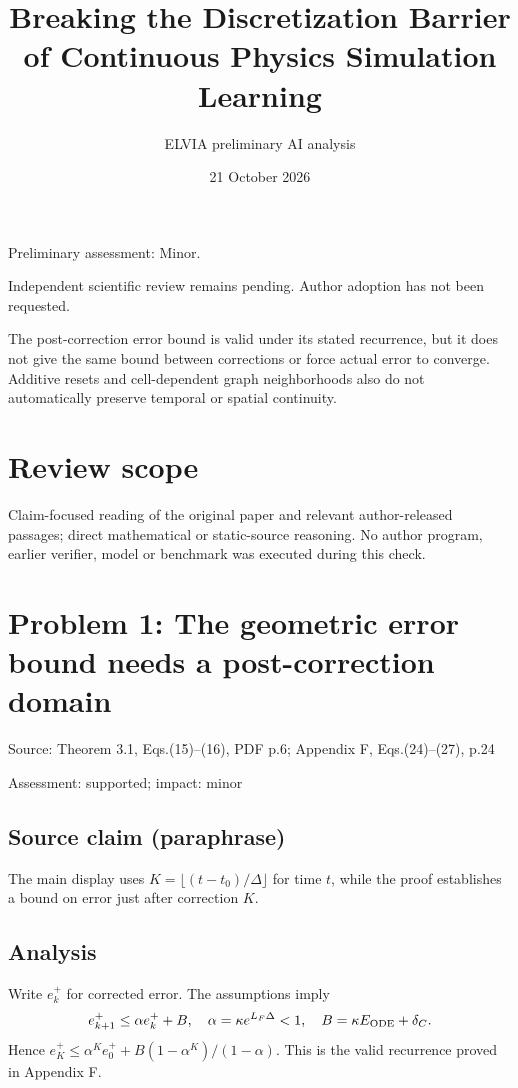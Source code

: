 \documentclass[11pt]{article}
\begin{document}
\title{Breaking the Discretization Barrier of Continuous Physics Simulation Learning}

\author{ELVIA preliminary AI analysis}\date{21 October 2026}\maketitle

Preliminary assessment: Minor.\par

Independent scientific review remains pending. Author adoption has not been requested.

The post-correction error bound is valid under its stated recurrence, but it does not give the same bound between corrections or force actual error to converge. Additive resets and cell-dependent graph neighborhoods also do not automatically preserve temporal or spatial continuity.

\section*{Review scope}

Claim-focused reading of the original paper and relevant author-released passages; direct mathematical or static-source reasoning. No author program, earlier verifier, model or benchmark was executed during this check.

\section*{Problem 1: The geometric error bound needs a post-correction domain}

Source: Theorem 3.1, Eqs.(15)–(16), PDF p.6; Appendix F, Eqs.(24)–(27), p.24

Assessment: supported; impact: minor

\subsection*{Source claim (paraphrase)}

The main display uses \(K=\lfloor(t-t_0)/\Delta\rfloor\) for time \(t\), while the proof establishes a bound on error just after correction \(K\).

\subsection*{Analysis}

Write \(e_k^+\) for corrected error. The assumptions imply \[e_{k+1}^+\le\alpha e_k^++B,\quad \alpha=\kappa e^{L_F\Delta}<1,\quad B=\kappa E_{\rm ODE}+\delta_C.\] Hence \(e_K^+\le\alpha^K e_0^++B(1-\alpha^K)/(1-\alpha)\). This is the valid recurrence proved in Appendix F.
\end{document}

